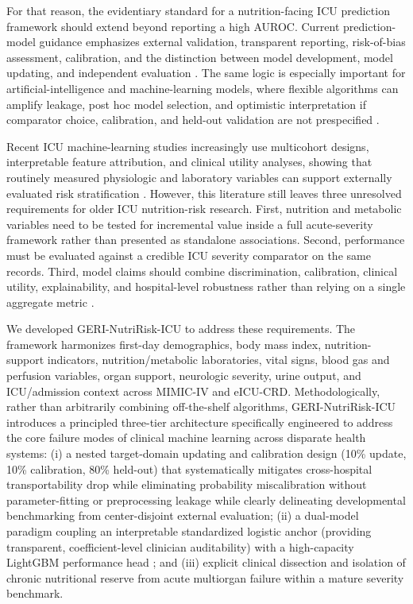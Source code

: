 \documentclass[utf8]{FrontiersinVancouver}
\newcommand{\re}[1]{#1}
\begin{document}
For that reason, the evidentiary standard for a nutrition-facing ICU prediction framework should extend beyond reporting a high AUROC. Current prediction-model guidance emphasizes external validation, transparent reporting, risk-of-bias assessment, calibration, and the distinction between model development, model updating, and independent evaluation \citep{Collins2024EvalPart1,Riley2024EvalPart2,Collins2024TRIPODAI}. The same logic is especially important for artificial-intelligence and machine-learning models, where flexible algorithms can amplify leakage, post hoc model selection, and optimistic interpretation if comparator choice, calibration, and held-out validation are not prespecified \citep{Moons2025PROBASTAI,VanCalster2023NoValidated,VanCalster2019Calibration}.

Recent ICU machine-learning studies increasingly use multicohort designs, interpretable feature attribution, and clinical utility analyses, showing that routinely measured physiologic and laboratory variables can support externally evaluated risk stratification \citep{Zhang2025IBD,Liu2026TabPFN,Huynh2026PAR}. However, this literature still leaves three unresolved requirements for older ICU nutrition-risk research. First, nutrition and metabolic variables need to be tested for incremental value inside a full acute-severity framework rather than presented as standalone associations. Second, performance must be evaluated against a credible ICU severity comparator on the same records. Third, model claims should combine discrimination, calibration, clinical utility, explainability, and hospital-level robustness rather than relying on a single aggregate metric \citep{Vickers2006DCA,Ghassemi2021XAI}.

We developed GERI-NutriRisk-ICU to address these requirements. The framework harmonizes first-day demographics, body mass index, nutrition-support indicators, nutrition/metabolic laboratories, vital signs, blood gas and perfusion variables, organ support, neurologic severity, urine output, and ICU/admission context across MIMIC-IV and eICU-CRD. \re{Methodologically, rather than arbitrarily combining off-the-shelf algorithms, GERI-NutriRisk-ICU introduces a principled three-tier architecture specifically engineered to address the core failure modes of clinical machine learning across disparate health systems: (i) a nested target-domain updating and calibration design (10\% update, 10\% calibration, 80\% held-out) that systematically mitigates cross-hospital transportability drop while eliminating probability miscalibration without parameter-fitting or preprocessing leakage while clearly delineating developmental benchmarking from center-disjoint external evaluation; (ii) a dual-model paradigm coupling an interpretable standardized logistic anchor (providing transparent, coefficient-level clinician auditability) with a high-capacity LightGBM performance head \citep{Chen2016XGBoost,Ke2017LightGBM}; and (iii) explicit clinical dissection and isolation of chronic nutritional reserve from acute multiorgan failure within a mature severity benchmark.}
\end{document}
